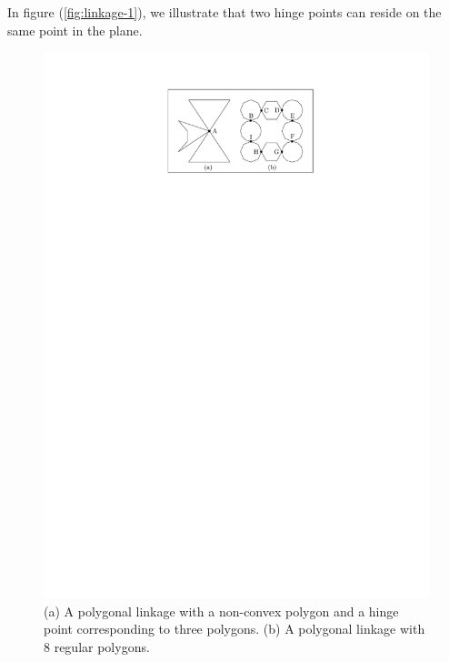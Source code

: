In figure (\ref{fig:linkage-1}), we illustrate that two hinge points can reside on the same point 
in the plane. 
\begin{figure}[h]
\begin{center}
\includegraphics[scale=1]{graphics/PolygonalLinkageExamples.pdf}
\end{center} 
\caption{(a) A polygonal linkage with a non-convex polygon and a hinge point corresponding to three 
polygons.  (b) A polygonal linkage with 8 regular polygons.}
\label{fig:linkage-2}
\end{figure}
